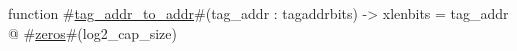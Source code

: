function #\hyperref[sailRISCVztagzyaddrzytozyaddr]{tag\_addr\_to\_addr}#(tag_addr : tagaddrbits) -> xlenbits = tag_addr @ #\hyperref[sailRISCVzzzeros]{zeros}#(log2_cap_size)
